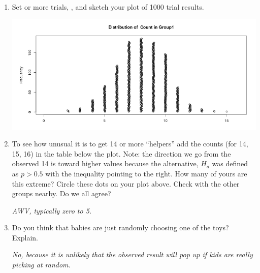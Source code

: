 \begin{enumerate}
\begin{key}
{\it 12 in my first, 8 in my second }
\end{key}

    \item  Set   or more trials,  , and   
              sketch your plot of 1000 trial results. 
\begin{students}
  \vspace{4cm}
\end{students}

\begin{key}
    \includegraphics[width=.8\linewidth]{../plots/Helper16.png}
\end{key}
\item To see how unusual it is to get 14 or more ``helpers'' add the
  counts (for 14, 15, 16) in the table below the plot. Note: the
  direction we go from the observed 14 is toward higher values because
  the alternative, $H_a$ was defined as $p > 0.5$ with the inequality
  pointing to the right.  
   How many of yours are this extreme? Circle
  these dots on your plot above. Check with the other groups
  nearby. Do we all agree?
\begin{students}
  \vspace{1.5cm}
\end{students}

\begin{key}
{\it  AWV, typically zero to 5.
}
\end{key}
\item  Do you think that babies are just randomly choosing one of
      the toys? Explain.
\begin{students}
  \vspace{1.5cm}
\end{students}

\begin{key}
  {\it No, because it is unlikely that the observed result will pop up
    if  kids are really picking at random. }
\end{key}

  \end{enumerate}
